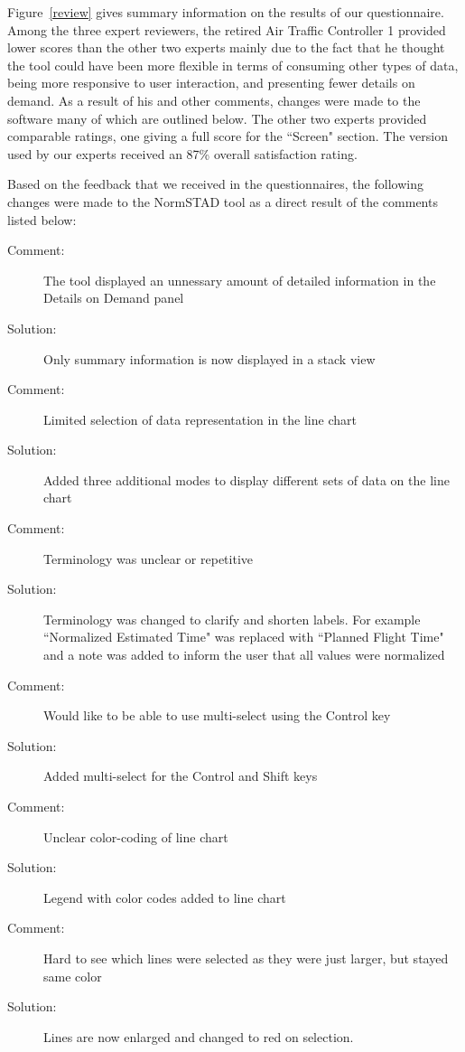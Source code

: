 \documentclass{sig-alternate}
\begin{document}
Figure~\ref{review} gives summary information on the results of our questionnaire.
Among the three expert reviewers, the retired Air Traffic Controller 1 provided
lower scores than the other two experts mainly due to the fact that he thought 
the tool could have been more flexible in terms of consuming other types of 
data, being more responsive to user interaction, and presenting fewer
details on demand. As a result of his and other comments, changes were made
to the software many of which are outlined below. The other two experts
provided comparable ratings, one giving a full score for the ``Screen" 
section.
The version used by our experts received an 87\% overall satisfaction
rating. 


Based on the feedback that we received in the questionnaires, the following changes
were made to the NormSTAD tool as a direct result of the comments listed below:
\begin{description}
	\item[Comment: ] The tool displayed an unnessary amount of detailed information
in the Details on Demand panel
	\item[Solution: ] Only summary information is now displayed in a stack view
	\item[Comment: ] Limited selection of data representation in the line chart
	\item[Solution: ] Added three additional modes to display different sets of data
on the line chart
	\item[Comment: ] Terminology was unclear or repetitive
	\item[Solution: ] Terminology was changed to clarify and shorten labels. For example
``Normalized Estimated Time" was replaced with ``Planned Flight Time" and a note was
added to inform the user that all values were normalized
	\item[Comment: ] Would like to be able to use multi-select using the Control key
	\item[Solution: ] Added multi-select for the Control and Shift keys
	\item[Comment: ] Unclear color-coding of line chart
	\item[Solution: ] Legend with color codes added to line chart
	\item[Comment: ] Hard to see which lines were selected as they were just larger, but
stayed same color
	\item[Solution: ] Lines are now enlarged and changed to red on selection.
\end{description}
\end{document}

